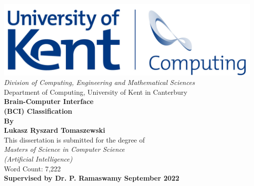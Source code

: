 \begin{titlepage}
\newcommand{\HRule}{\rule{\linewidth}{0.5mm}}
\begin{centering} 
\includegraphics[scale=0.95]{Format/TitlePage/uksc_logo.png} \\
\vspace{0.5cm} 
\large{\emph{Division of Computing, Engineering and Mathematical Sciences}} \\ [0.1cm]
\large{{Department of Computing, University of Kent in Canterbury}} \\ [1.5cm]
\Huge{\bfseries{Brain-Computer Interface \\ (BCI) Classification}} \\ [1.5cm]
\textbf{{\Large{By \\ [-0.1cm] Lukasz Ryszard Tomaszewski}}}\\[0.8cm]
\large{This dissertation is submitted for the degree of \\ [0.2cm] \emph{Masters of Science in Computer Science \\ [0.1cm] (Artificial Intelligence)}}\\ [1.0cm]
\large{Word Count: 7,222}\\ [2.0cm]
\textbf{\large{Supervised by Dr. P. Ramaswamy \hspace{3cm} September 2022}}\\
\end{centering} 
\end{titlepage}
